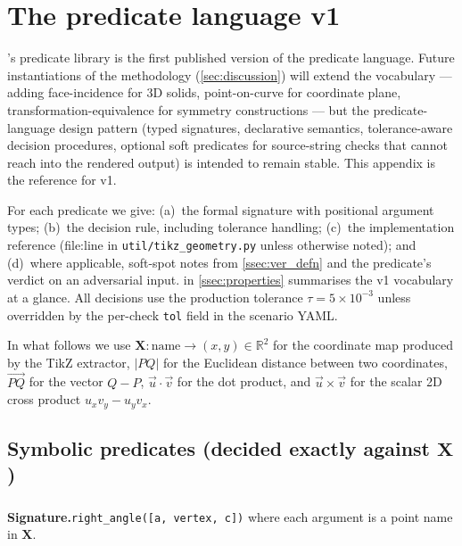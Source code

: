 \section{The \GeoGen predicate language v1}
\label{app:property_reference}

\GeoGenBench's predicate library is the first published version of the \GeoGen predicate language.
Future instantiations of the methodology (\cref{sec:discussion}) will extend the vocabulary --- adding face-incidence for 3D solids, point-on-curve for coordinate plane, transformation-equivalence for symmetry constructions --- but the predicate-language design pattern (typed signatures, declarative semantics, tolerance-aware decision procedures, optional soft predicates for source-string checks that cannot reach into the rendered output) is intended to remain stable.
This appendix is the reference for v1.

For each predicate we give: (a)~the formal signature with positional argument types; (b)~the decision rule, including tolerance handling; (c)~the implementation reference (file:line in \texttt{util/tikz\_geometry.py} unless otherwise noted); and (d)~where applicable, soft-spot notes from \cref{ssec:ver_defn} and the predicate's verdict on an adversarial input.
 in \cref{ssec:properties} summarises the v1 vocabulary at a glance.
All decisions use the production tolerance $\tau = 5\times 10^{-3}$ unless overridden by the per-check \texttt{tol} field in the scenario YAML.

In what follows we use $\mathbf{X}: \text{name} \to (x, y) \in \mathbb{R}^2$ for the coordinate map produced by the TikZ extractor, $|PQ|$ for the Euclidean distance between two coordinates, $\vec{PQ}$ for the vector $Q-P$, $\vec{u}\cdot\vec{v}$ for the dot product, and $\vec{u}\times\vec{v}$ for the scalar 2D cross product $u_x v_y - u_y v_x$.

\subsection{Symbolic predicates (decided exactly against \texorpdfstring{$\mathbf{X}$}{X})}

\subsubsection{}
\label{app:pred:right_angle}

\noindent\textbf{Signature.}\quad \texttt{right\_angle([a, vertex, c])} where each argument is a point name in $\mathbf{X}$.

